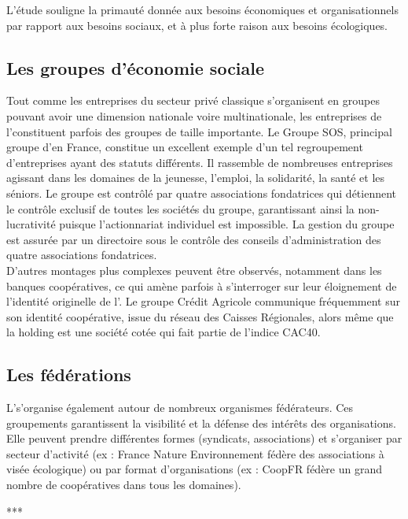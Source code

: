         L'étude souligne la primauté donnée aux besoins économiques et organisationnels par rapport aux besoins sociaux, et à plus forte raison aux besoins écologiques.


    \subsection{Les groupes d'économie sociale}
        Tout comme les entreprises du secteur privé classique s'organisent en groupes pouvant avoir une dimension nationale voire multinationale, les entreprises de l'\ess constituent parfois des groupes de taille importante. Le Groupe SOS, principal groupe d'\ess en France, constitue un excellent exemple d'un tel regroupement d'entreprises ayant des statuts différents. Il rassemble de nombreuses entreprises agissant dans les domaines de la jeunesse, l'emploi, la solidarité, la santé et les séniors. Le groupe est contrôlé par quatre associations fondatrices qui détiennent le contrôle exclusif de toutes les sociétés du groupe, garantissant ainsi la non-lucrativité puisque l'actionnariat individuel est impossible. La gestion du groupe est assurée par un directoire sous le contrôle des conseils d'administration des quatre associations fondatrices. \\

        D'autres montages plus complexes peuvent être observés, notamment dans les banques coopératives, ce qui amène parfois à s'interroger sur leur éloignement de l'identité originelle de l'\ess \parencite{bidet2003insoutenable}. Le groupe Crédit Agricole communique fréquemment sur son identité coopérative, issue du réseau des Caisses Régionales, alors même que la holding est une société cotée qui fait partie de l'indice CAC40.

    \subsection{Les fédérations}

        L'\ess s'organise également autour de nombreux organismes fédérateurs. Ces groupements garantissent la visibilité et la défense des intérêts des organisations. Elle peuvent prendre différentes formes (syndicats, associations) et s'organiser par secteur d'activité (ex : France Nature Environnement fédère des associations à visée écologique) ou par format d'organisations (ex : CoopFR fédère un grand nombre de coopératives dans tous les domaines).

        \begin{center}
            ***
        \end{center}



